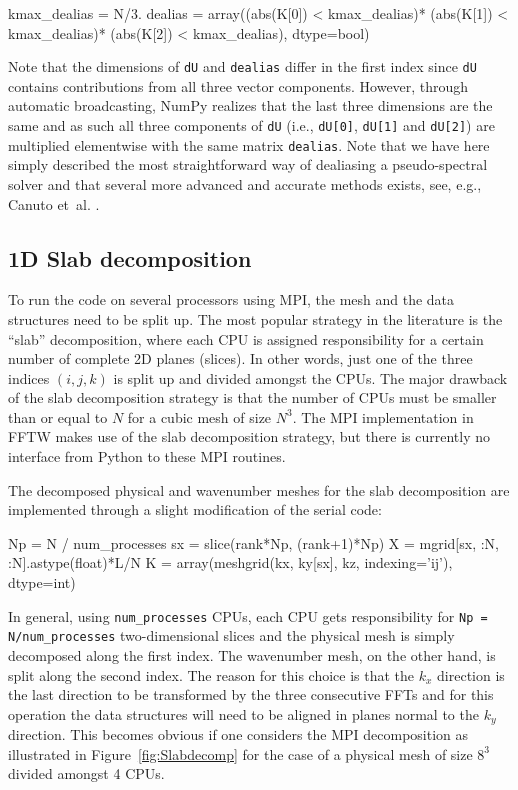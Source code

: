 \documentclass[final,3p,times,twocolumn]{elsarticle}
\newcommand{\inpyth}{\lstinline[style=inlinestyle]}
\begin{document}
\begin{python}
kmax_dealias = N/3.
dealias = array((abs(K[0]) < kmax_dealias)*
                (abs(K[1]) < kmax_dealias)*
                (abs(K[2]) < kmax_dealias), 
                dtype=bool)
\end{python}
Note that the dimensions of \inpyth{dU} and \inpyth{dealias} differ in the 
first index since \inpyth{dU} contains contributions from all three vector 
components. However, through automatic broadcasting, NumPy realizes that the 
last three dimensions are the same and as such all three components of 
\inpyth{dU} (i.e.,  \inpyth{dU[0]}, \inpyth{dU[1]} and  \inpyth{dU[2]}) are 
multiplied elementwise with the same matrix \inpyth{dealias}. Note that we have 
here simply described the most straightforward way of dealiasing a 
pseudo-spectral solver and that several more advanced and accurate methods 
exists, see, e.g., Canuto et~al. \cite{canuto1988}.

\subsection{1D Slab decomposition}
\label{slab1D}

To run the code on several processors using MPI, the mesh and the data 
structures need to be split up. The most popular strategy in the literature is 
the ``slab'' decomposition, where each CPU is assigned responsibility for a 
certain number of complete 2D planes (slices). In other words, just one of the 
three indices $(i,j,k)$ is split up and divided amongst the CPUs. The major 
drawback of the slab decomposition strategy is that the number of CPUs must be 
smaller than or equal to $N$ for a cubic mesh of size $N^3$. The MPI 
implementation in FFTW makes use of the slab decomposition strategy, but there 
is currently no interface from Python to these MPI routines.

The decomposed physical and wavenumber meshes for the slab decomposition are implemented through a slight modification of the serial code:

\begin{python}
Np = N / num_processes
sx = slice(rank*Np, (rank+1)*Np)
X = mgrid[sx, :N, :N].astype(float)*L/N
K = array(meshgrid(kx, ky[sx], kz,
          indexing='ij'), dtype=int)
\end{python}
In general, using \inpyth{num_processes} CPUs, each CPU gets responsibility for \inpyth{Np = N/num_processes} two-dimensional slices and the physical mesh is simply decomposed along the first index. The wavenumber mesh, on the other hand, is split along the second index. The reason for this choice is that the $k_x$ direction is the last direction to be transformed by the three consecutive FFTs and for this operation the data structures will need to be aligned in planes normal to the $k_y$ direction. This becomes obvious if one considers the MPI decomposition as illustrated in Figure~\ref{fig:Slabdecomp} for the case of a physical mesh of size $8^3$ divided amongst 4 CPUs.
\end{document}
